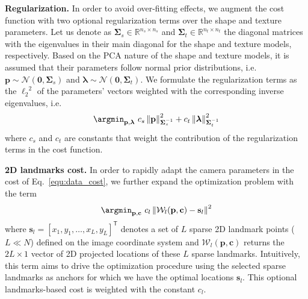 %
\textbf{Regularization.} In order to avoid over-fitting effects, we augment the
cost function with two optional regularization terms over the shape and texture
parameters. Let us denote as $\mathbf{\Sigma}_s\in\mathbb{R}^{n_s\times n_s}$
and $\mathbf{\Sigma}_t\in\mathbb{R}^{n_t\times n_t}$ the diagonal matrices with
the eigenvalues in their main diagonal for the shape and texture models,
respectively. Based on the PCA nature of the shape and texture models, it is
assumed that their parameters follow normal prior distributions, i.e.
$\mathbf{p}\sim\mathcal{N}(\mathbf{0},\mathbf{\Sigma}_s)$ and
$\boldsymbol{\lambda}\sim\mathcal{N}(\mathbf{0},\mathbf{\Sigma}_t)$.
We formulate the regularization terms as the ${\ell_2}^2$ of the
parameters' vectors weighted with the corresponding inverse eigenvalues, i.e.
%
\begin{equation}
\argmin_{\mathbf{p}, \boldsymbol{\lambda}}~c_s\left\lVert\mathbf{p}\right\rVert^2_{\mathbf{\Sigma}_s^{-1}} + c_t\left\lVert\boldsymbol{\lambda}\right\rVert^2_{\mathbf{\Sigma}_t^{-1}}
\label{equ:priors}
\end{equation}
%
where $c_s$ and $c_t$ are constants that weight the contribution of the regularization
terms in the cost function.

%
\textbf{2D landmarks cost.} In order to rapidly adapt the camera parameters in
the cost of Eq.~\ref{equ:data_cost}, we further expand the optimization problem
with the term
%
\begin{equation}
\argmin_{\mathbf{p},\mathbf{c}}~c_l\left\lVert\mathcal{W}_l(\mathbf{p},\mathbf{c}) - \mathbf{s}_l\right\rVert^2
\label{equ:landmarks_cost}
\end{equation}
%
where $\mathbf{s}_l={\left[x_1,y_1,\ldots,x_L,y_L\right]}^\mathsf{T}$ denotes a
set of $L$ sparse 2D landmark points ($L\ll N$) defined on the image coordinate
system and $\mathcal{W}_l(\mathbf{p},\mathbf{c})$ returns the $2L\times 1$ vector
of 2D projected locations of these $L$ sparse landmarks. Intuitively, this term
aims to drive the optimization procedure using the selected sparse landmarks as
anchors for which we have the optimal locations $\mathbf{s}_l$.
This optional landmarks-based cost is weighted with the constant $c_l$.

